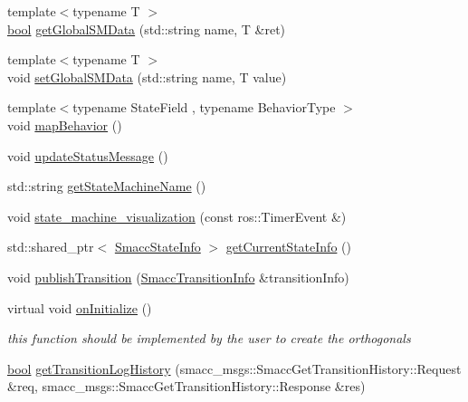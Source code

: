 \begin{DoxyCompactItemize}
\item 
{\footnotesize template$<$typename T $>$ }\\\hyperlink{classbool}{bool} \hyperlink{classsmacc_1_1ISmaccStateMachine_aeda2d6813c6c428bf318a5792e014b61}{get\+Global\+S\+M\+Data} (std\+::string name, T \&ret)
\item 
{\footnotesize template$<$typename T $>$ }\\void \hyperlink{classsmacc_1_1ISmaccStateMachine_a8588f9e580fbb95b53e2bd2ca3ff1f98}{set\+Global\+S\+M\+Data} (std\+::string name, T value)
\item 
{\footnotesize template$<$typename State\+Field , typename Behavior\+Type $>$ }\\void \hyperlink{classsmacc_1_1ISmaccStateMachine_acfb75233b79062cc7769ea751b7f320d}{map\+Behavior} ()
\item 
void \hyperlink{classsmacc_1_1ISmaccStateMachine_ad246a49015fadaeb0b1639d7ab99f7d0}{update\+Status\+Message} ()
\item 
std\+::string \hyperlink{classsmacc_1_1ISmaccStateMachine_a2d0b1742f17dd77d5df217153e8b5259}{get\+State\+Machine\+Name} ()
\item 
void \hyperlink{classsmacc_1_1ISmaccStateMachine_ac03029f770422d0ea77ea9856b8cb1a8}{state\+\_\+machine\+\_\+visualization} (const ros\+::\+Timer\+Event \&)
\item 
std\+::shared\+\_\+ptr$<$ \hyperlink{classsmacc_1_1introspection_1_1SmaccStateInfo}{Smacc\+State\+Info} $>$ \hyperlink{classsmacc_1_1ISmaccStateMachine_a4738679e8e5f7adab35e610dce0bfff7}{get\+Current\+State\+Info} ()
\item 
void \hyperlink{classsmacc_1_1ISmaccStateMachine_ab61bff5b3c49c4bfc17972e2de8d4fd5}{publish\+Transition} (\hyperlink{structsmacc_1_1introspection_1_1SmaccTransitionInfo}{Smacc\+Transition\+Info} \&transition\+Info)
\item 
virtual void \hyperlink{classsmacc_1_1ISmaccStateMachine_ac2982c6c8283663e5e1e8a7c82f511ec}{on\+Initialize} ()
\begin{DoxyCompactList}\small\item\em this function should be implemented by the user to create the orthogonals \end{DoxyCompactList}\item 
\hyperlink{classbool}{bool} \hyperlink{classsmacc_1_1ISmaccStateMachine_a7508f4e398e263cdce308c8074bd5151}{get\+Transition\+Log\+History} (smacc\+\_\+msgs\+::\+Smacc\+Get\+Transition\+History\+::\+Request \&req, smacc\+\_\+msgs\+::\+Smacc\+Get\+Transition\+History\+::\+Response \&res)

\end{DoxyCompactItemize}
